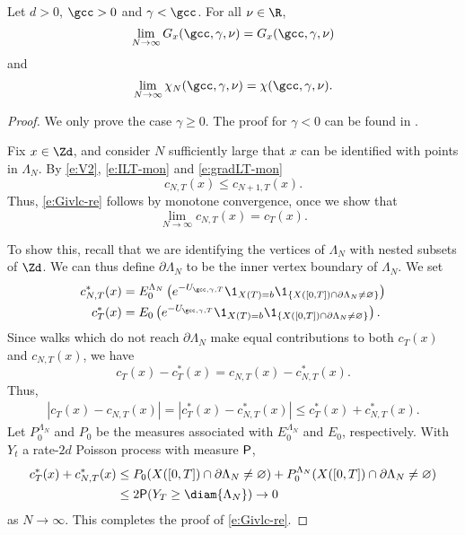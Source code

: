 \begin{prop}
\label{prop:finvol-re}
Let $d >0$, $\gcc >0$ and $\gamma < \gcc$. For all $\nu \in \R$,
\begin{equation}
\label{e:Givlc-re}
\lim_{N \to \infty}
G_x(\gcc,\gamma,\nu)
=
G_x(\gcc,\gamma,\nu)
\end{equation}
and
\begin{equation}
\label{e:chilim-re}
\lim_{N\to\infty}\chi_N(\gcc,\gamma,\nu)=   \chi(\gcc,\gamma,\nu).
\end{equation}
\end{prop}

\begin{proof}
We only prove the case $\gamma \ge 0$. The proof for $\gamma < 0$ can be found in
\cite{BSW-saw-sa}.

Fix $x \in \Zd$, and consider $N$ sufficiently large that $x$ can be identified
with points in $\Lambda_N$.
By \eqref{e:V2}, \eqref{e:ILT-mon} and \eqref{e:gradLT-mon}
\begin{equation}
\label{e:ctmon}
c_{N,T}(x) \leq c_{N+1,T}(x).
\end{equation}
Thus, \eqref{e:Givlc-re} follows by monotone convergence, once we show that
\begin{equation}
\lim_{N\to\infty} c_{N,T}(x) = c_T(x).
\end{equation}

To show this, recall that we are identifying the vertices of $\Lambda_N$
with nested subsets of $\Zd$. We can thus define $\partial \Lambda_N$ to be
the inner vertex boundary of $\Lambda_N$. We set
\begin{align}
c_{N,T}^*(x)
  &=
E^{\Lambda_N}_0
\left(
  e^{-U_{\gcc,\gamma,T}} \1_{X(T)=b} \1_{\{X([0, T]) \cap \partial \Lambda_N \neq \varnothing\}}
\right) \\
c_T^*(x)
  &=
E_0
\left(
  e^{-U_{\gcc,\gamma,T}} \1_{X(T)=b} \1_{\{X([0, T]) \cap \partial \Lambda_N \neq \varnothing\}}
\right).
\end{align}
Since walks which do not reach $\partial \Lambda_N$ make equal contributions to both
$c_T(x)$ and $c_{N,T}(x)$,
we have
\begin{equation}
c_T(x) - c_T^*(x) = c_{N,T}(x) - c_{N,T}^*(x).
\end{equation}
Thus,
\begin{align}
|c_T(x) - c_{N,T}(x)|
= |c_T^*(x) - c_{N,T}^*(x)|
\leq c_T^*(x) + c_{N,T}^*(x).
\end{align}
Let $P^{\Lambda_N}_0$ and $P_0$ be the measures
associated with $E^{\Lambda_N}_0$ and $E_0$, respectively.
With $Y_t$ a rate-$2d$ Poisson process with measure ${\sf P}$,
\begin{align}
 c_T^*(x) + c_{N,T}^*(x)
  &\leq P_0 (X([0, T]) \cap \partial\Lambda_N \neq \varnothing)
    + P^{\Lambda_N}_0 (X([0, T]) \cap \partial\Lambda_N \neq \varnothing) \nonumber \\
  &\leq 2 {\sf P} (Y_T \geq \diam{\Lambda_N}) \to 0
\end{align}
as $N\to\infty$.
This completes the proof of \eqref{e:Givlc-re}.


\end{proof}
